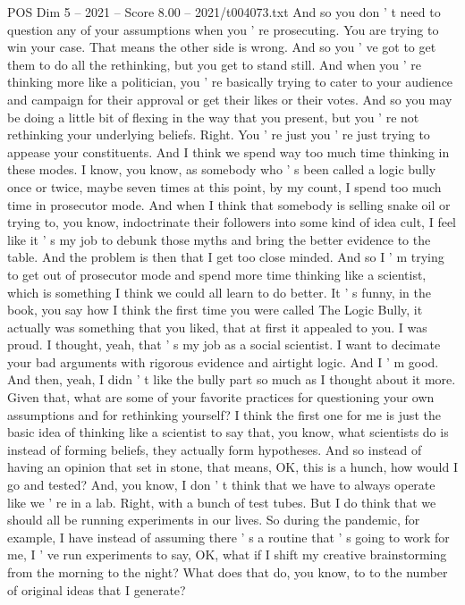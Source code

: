 \begin{textsample}{POS Dim 5 – 2021 – Score 8.00 – 2021/t004073.txt}
And so you don ' t need to question any of your assumptions when you ' re prosecuting.
You are trying to win your case.
That means the other side is wrong.
And so you ' ve got to get them to do all the rethinking, but you get to stand still.
And when you ' re thinking more like a politician, you ' re basically trying to cater to your audience and campaign for their approval or get their likes or their votes.
And so you may be doing a little bit of flexing in the way that you present, but you ' re not rethinking your underlying beliefs.
Right.
You ' re just you ' re just trying to appease your constituents.
And I think we spend way too much time thinking in these modes.
I know, you know, as somebody who ' s been called a logic bully once or twice, maybe seven times at this point, by my count, I spend too much time in prosecutor mode.
And when I think that somebody is selling snake oil or trying to, you know, indoctrinate their followers into some kind of idea cult, I feel like it ' s my job to debunk those myths and bring the better evidence to the table.
And the problem is then that I get too close minded.
And so I ' m trying to get out of prosecutor mode and spend more time thinking like a scientist, which is something I think we could all learn to do better.
It ' s funny, in the book, you say how I think the first time you were called The Logic Bully, it actually was something that you liked, that at first it appealed to you.
I was proud.
I thought, yeah, that ' s my job as a social scientist.
I want to decimate your bad arguments with rigorous evidence and airtight logic.
And I ' m good.
And then, yeah, I didn ' t like the bully part so much as I thought about it more.
Given that, what are some of your favorite practices for questioning your own assumptions and for rethinking yourself?
I think the first one for me is just the basic idea of thinking like a scientist to say that, you know, what scientists do is instead of forming beliefs, they actually form hypotheses.
And so instead of having an opinion that set in stone, that means, OK, this is a hunch, how would I go and tested?
And, you know, I don ' t think that we have to always operate like we ' re in a lab.
Right, with a bunch of test tubes.
But I do think that we should all be running experiments in our lives.
So during the pandemic, for example, I have instead of assuming there ' s a routine that ' s going to work for me, I ' ve run experiments to say, OK, what if I shift my creative brainstorming from the morning to the night?
What does that do, you know, to to the number of original ideas that I generate?

\end{textsample}
